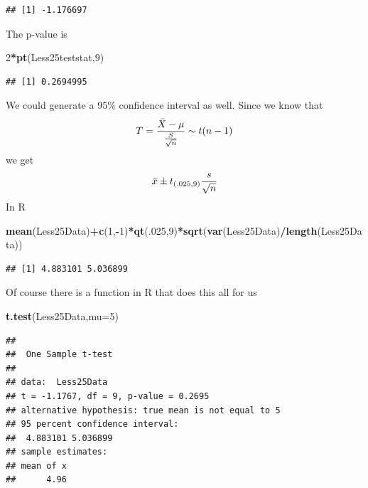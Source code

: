 \documentclass[]{book}
\newenvironment{Shaded}{\begin{snugshade}}{\end{snugshade}}
\newcommand{\KeywordTok}[1]{\textcolor[rgb]{0.13,0.29,0.53}{\textbf{#1}}}
\newcommand{\DataTypeTok}[1]{\textcolor[rgb]{0.13,0.29,0.53}{#1}}
\newcommand{\DecValTok}[1]{\textcolor[rgb]{0.00,0.00,0.81}{#1}}
\newcommand{\OperatorTok}[1]{\textcolor[rgb]{0.81,0.36,0.00}{\textbf{#1}}}
\newcommand{\NormalTok}[1]{#1}
\theoremstyle{definition}
\theoremstyle{definition}
\theoremstyle{definition}
\theoremstyle{remark}
\begin{document}
\begin{verbatim}
## [1] -1.176697
\end{verbatim}

The p-value is

\begin{Shaded}
\begin{Highlighting}[]
\DecValTok{2}\OperatorTok{*}\KeywordTok{pt}\NormalTok{(Less25teststat,}\DecValTok{9}\NormalTok{)}
\end{Highlighting}
\end{Shaded}

\begin{verbatim}
## [1] 0.2694995
\end{verbatim}

We could generate a 95\% confidence interval as well. Since we know that
\[T= {\bar{X} - \mu \over {S \over \sqrt{n}}} \sim t(n-1)\] we get
\[\bar{x}\pm t_{(.025,9)}{s \over \sqrt{n}}\] In R

\begin{Shaded}
\begin{Highlighting}[]
\KeywordTok{mean}\NormalTok{(Less25Data)}\OperatorTok{+}\KeywordTok{c}\NormalTok{(}\DecValTok{1}\NormalTok{,}\OperatorTok{-}\DecValTok{1}\NormalTok{)}\OperatorTok{*}\KeywordTok{qt}\NormalTok{(.}\DecValTok{025}\NormalTok{,}\DecValTok{9}\NormalTok{)}\OperatorTok{*}\KeywordTok{sqrt}\NormalTok{(}\KeywordTok{var}\NormalTok{(Less25Data)}\OperatorTok{/}\KeywordTok{length}\NormalTok{(Less25Data))}
\end{Highlighting}
\end{Shaded}

\begin{verbatim}
## [1] 4.883101 5.036899
\end{verbatim}

Of course there is a function in R that does this all for us

\begin{Shaded}
\begin{Highlighting}[]
\KeywordTok{t.test}\NormalTok{(Less25Data,}\DataTypeTok{mu=}\DecValTok{5}\NormalTok{)}
\end{Highlighting}
\end{Shaded}

\begin{verbatim}
## 
##  One Sample t-test
## 
## data:  Less25Data
## t = -1.1767, df = 9, p-value = 0.2695
## alternative hypothesis: true mean is not equal to 5
## 95 percent confidence interval:
##  4.883101 5.036899
## sample estimates:
## mean of x 
##      4.96
\end{verbatim}
\end{document}
